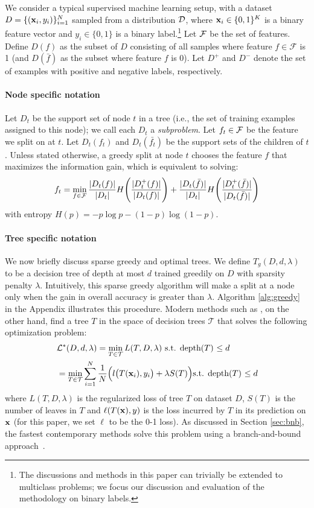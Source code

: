 
We consider a typical supervised machine learning setup, with a dataset $D = \{(\mathbf{x}_i, y_i)\}_{i=1}^N$ sampled from a distribution $\mathcal{D}$, where $\mathbf{x}_i \in \{0,1\}^K$ is a binary feature vector and $y_i\in \{0, 1\}$ is a binary label.\footnote{The discussions and methods in this paper can trivially be extended to multiclass problems; we focus our discussion and evaluation of the methodology on binary labels.} Let $\mathcal{F}$ be the set of features. Define \(D(f)\) as the subset of \(D\) consisting of all samples where feature \(f \in \mathcal{F}\) is 1 (and \(D(\bar{f})\) as the subset where feature $f$ is 0). Let \(D^+\) and \(D^-\) denote the set of examples with positive and negative labels, respectively. 
\paragraph{Node specific notation}
Let $D_t$ be the support set of node $t$ in a tree (i.e., the set of training examples assigned to this node); we call each $D_t$ a \textit{subproblem}. 
Let $f_t \in \mathcal{F}$ be the feature we split on at $t$. Let $D_t(f_t)$ and $D_t(\bar{f_t})$ be the support sets of the children of $t$. Unless stated otherwise, a greedy split at node $t$ chooses the feature $f$ that maximizes the information gain, which is equivalent to solving:
\[
      f_t = \min_{f\in \mathcal{F}} \frac{|D_t(f)|}{|D_t|} H\Bigg(\frac{|D_t^+(f)|}{|D_t(f)|}\Bigg)
    + \frac{|D_t(\bar{f})|}{|D_t|}H\Bigg(\frac{|D_t^+(\bar{f})|}{|D_t(\bar{f})|}\Bigg)
\]
with entropy $H(p) = -p\log p - (1-p)\log(1-p)$.
\paragraph{Tree specific notation}
We now briefly discuss sparse greedy and optimal trees.
We define $T_g(D, d, \lambda)$ to be a decision tree of depth at most $d$ trained greedily on $D$ with sparsity penalty $\lambda$. Intuitively, this sparse greedy algorithm will make a split at a node only when the gain in overall accuracy is greater than $\lambda$. Algorithm \ref{alg:greedy} in the Appendix illustrates this procedure. Modern methods such as \citet{gosdt, gosdt_guesses}, on the other hand, find a tree $T$ in the space of decision trees $\mathcal{T}$ that solves the following optimization problem:
\begin{align}
    &\mathcal{L}^*(D, d, \lambda) = \min_{T \in \mathcal{T}} L(T, D, \lambda) \textrm{ s.t.  depth$(T)$ $\leq d$}
    \label{eqn:obj} \\
    &= \min_{T \in \mathcal{T}} \sum_{i=1}^N\frac{1}{N}\Big({l\big(T(\mathbf{x}_i), y_i\big) + \lambda S(T)\Big)} \textrm{s.t. depth$(T)$ $\leq d$} \nonumber
\end{align}
where $L(T, D, \lambda)$ is the regularized loss of tree $T$ on dataset $D$, $S(T)$ is the number of leaves in $T$ and $\ell(T(\mathbf{x}), y)$ is the loss incurred by $T$ in its prediction on $\mathbf{x}$ (for this paper, we set $\ell$ to be the 0-1 loss). 
As discussed in Section \ref{sec:bnb}, the fastest contemporary methods solve this problem using a branch-and-bound approach~\citep{costa2023recent, gosdt, murtree,  gosdt_guesses}.

